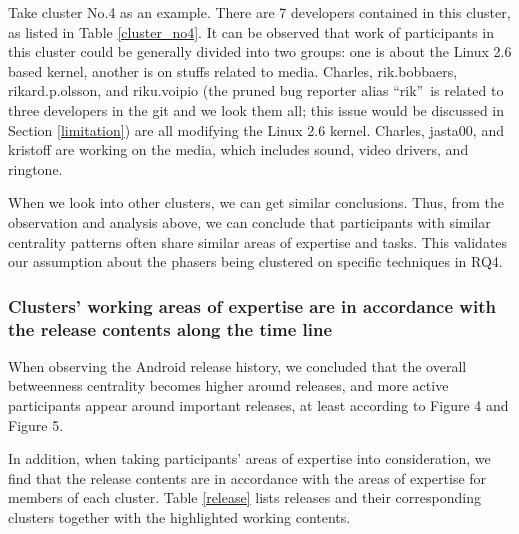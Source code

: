 \documentclass[conference]{IEEEtran}
\begin{document}

Take cluster No.4 as an example. There are 7 developers
contained in this cluster, as listed in Table \ref{cluster_no4}.
It can be observed that work of participants in this cluster
could be generally divided into two groups: one is about the Linux 2.6
based kernel, another is on stuffs related to media. Charles, rik.bobbaers, rikard.p.olsson, and riku.voipio (the pruned bug reporter alias \textquotedblleft rik\textquotedblright \ is related to three developers in the git and we look them all; this issue would be discussed in Section \ref{limitation}) are all modifying the Linux 2.6
kernel. Charles, jasta00, and kristoff are working on
the media, which includes sound, video drivers, and
ringtone. 

When we look into other clusters, we can get similar conclusions.
Thus, from the observation and analysis above, we can conclude that
participants with similar centrality patterns often share similar
areas of expertise and tasks. This validates our assumption about the phasers being clustered on specific techniques in RQ4.

\subsubsection{Clusters' working areas of expertise are in accordance with the release contents along the time line}

When observing the Android release history, we concluded
that the overall betweenness centrality becomes higher around
releases, and more active participants appear around important
releases, at least according to Figure 4 and Figure 5.


In addition, when taking participants' areas of expertise into consideration,
we find that the release contents are in accordance with the
areas of expertise for members of each cluster. Table \ref{release} lists
releases and their corresponding clusters together with the
highlighted working contents.
\end{document}
